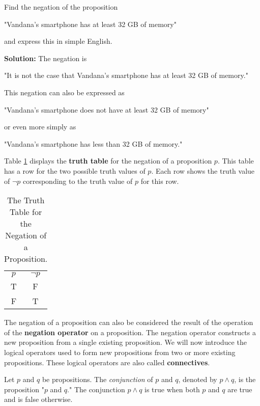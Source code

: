 \documentclass{Axon}
\begin{document}
\begin{example}
    Find the negation of the proposition
    \begin{center}
        "Vandana's smartphone has at least 32 GB of memory"
    \end{center}
    and express this in simple English.

    \noindent
    \textbf{Solution:}
    The negation is
    \begin{center}
        "It is not the case that Vandana's smartphone has at least 32 GB of memory."
    \end{center}
    This negation can also be expressed as
    \begin{center}
        "Vandana's smartphone does not have at least 32 GB of memory"
    \end{center}
    or even more simply as
    \begin{center}
        "Vandana's smartphone has less than 32 GB of memory."
    \end{center}
\end{example}

Table \ref{Table: 1} displays the \textbf{truth table} for the negation of a proposition \(p\). This table has a row for the two possible truth values of \(p\). Each row shows the truth value of \(\lnot p\) corresponding to the truth value of \(p\) for this row.

\begin{table}[h]
    \centering
    \begin{tabular}{c|c}
        \(p\) & \(\lnot p\) \\
        T     & F\\
        F     & T
    \end{tabular}
    \caption{The Truth Table for the Negation of a Proposition.}
    \label{Table: 1}
\end{table}

The negation of a proposition can also be considered the result of the operation of the \textbf{negation operator} on a proposition. The negation operator constructs a new proposition from a single existing proposition. We will now introduce the logical operators used to form new propositions from two or more existing propositions. These logical operators are also called \textbf{connectives}.

\begin{definition}
    Let \(p\) and \(q\) be propositions. The \textit{conjunction} of \(p\) and \(q\), denoted by \(p \land q\), is the proposition "\(p\) and \(q\)." The conjunction \(p \land q\) is true when both \(p\) and \(q\) are true and is false otherwise.
\end{definition}
\end{document}
